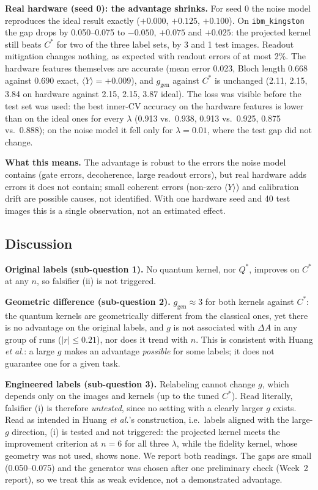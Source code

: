 \documentclass[conference]{IEEEtran}
\begin{document}
\textbf{Real hardware (seed 0): the advantage shrinks.} For seed 0 the noise model reproduces the ideal result exactly ($+0.000$, $+0.125$, $+0.100$). On \texttt{ibm\_kingston} the gap drops by 0.050--0.075 to $-0.050$, $+0.075$ and $+0.025$: the projected kernel still beats $C^\ast$ for two of the three label sets, by 3 and 1 test images. Readout mitigation changes nothing, as expected with readout errors of at most 2\%. The hardware features themselves are accurate (mean error 0.023, Bloch length 0.668 against 0.690 exact, $\langle Y\rangle=+0.009$), and $g_{\mathrm{gen}}$ against $C^\ast$ is unchanged (2.11, 2.15, 3.84 on hardware against 2.15, 2.15, 3.87 ideal). The loss was visible before the test set was used: the best inner-CV accuracy on the hardware features is lower than on the ideal ones for every $\lambda$ (0.913 vs.\ 0.938, 0.913 vs.\ 0.925, 0.875 vs.\ 0.888); on the noise model it fell only for $\lambda=0.01$, where the test gap did not change.

\textbf{What this means.} The advantage is robust to the errors the noise model contains (gate errors, decoherence, large readout errors), but real hardware adds errors it does not contain; small coherent errors (non-zero $\langle Y\rangle$) and calibration drift are possible causes, not identified. With one hardware seed and 40 test images this is a single observation, not an estimated effect.

\subsection{Discussion}\label{sec:disc}
\textbf{Original labels (sub-question 1).} No quantum kernel, nor $Q^\ast$, improves on $C^\ast$ at any $n$, so falsifier (ii) is not triggered.

\textbf{Geometric difference (sub-question 2).} $g_{\mathrm{gen}}\approx3$ for both kernels against $C^\ast$: the quantum kernels are geometrically different from the classical ones, yet there is no advantage on the original labels, and $g$ is not associated with $\Delta A$ in any group of runs ($|r|\le0.21$), nor does it trend with $n$. This is consistent with Huang \textit{et al.}: a large $g$ makes an advantage \emph{possible} for some labels; it does not guarantee one for a given task.

\textbf{Engineered labels (sub-question 3).} Relabeling cannot change $g$, which depends only on the images and kernels (up to the tuned $C^\ast$). Read literally, falsifier (i) is therefore \emph{untested}, since no setting with a clearly larger $g$ exists. Read as intended in Huang \textit{et al.}'s construction, i.e.\ labels aligned with the large-$g$ direction, (i) is tested and not triggered: the projected kernel meets the improvement criterion at $n=6$ for all three $\lambda$, while the fidelity kernel, whose geometry was not used, shows none. We report both readings. The gaps are small (0.050--0.075) and the generator was chosen after one preliminary check (Week~2 report), so we treat this as weak evidence, not a demonstrated advantage.
\end{document}
